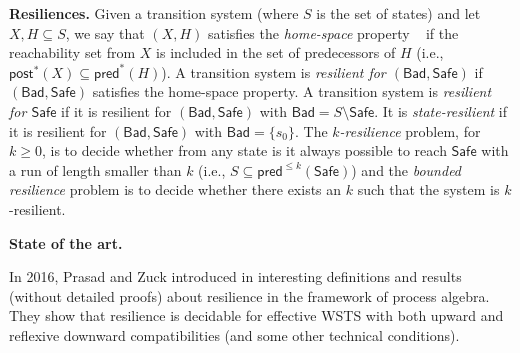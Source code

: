 \documentclass[runningheads]{llncs}
\newcommand{\pred}{\textsf{pred}}
\newcommand{\post}{\textsf{post}}
\newcommand{\Bad}{\textsf{Bad}}
\newcommand{\Safe}{\textsf{Safe}}
\begin{document}
\noindent
{\bf Resiliences.}  
%
Given a transition system (where $S$ is the set of states) and let $X,H \subseteq S$, we say that $(X,H)$ satisfies the \emph{home-space} property ~\cite{DBLP:conf/ac/MemmiV86} if the reachability set from $X$ is included in the set of predecessors of $H$ (i.e., $\post^*(X) \subseteq \pred^*(H)$).
%
A transition system is {\em resilient for $(\Bad,\Safe)$} if $(\Bad,\Safe)$ satisfies the home-space property. A transition system is {\em resilient for $\Safe$} if it is resilient for $(\Bad,\Safe)$ with $\Bad=S \setminus \Safe$. It is {\em state-resilient} if it is resilient for $(\Bad,\Safe)$ with $\Bad=\{s_0\}$.
%
%
%
The {\em $k$-resilience} problem, for $k\geq0$, is to decide whether from any state is it always possible to reach $\Safe$ with a run of length smaller than $k$ (i.e., $S \subseteq \pred^{\leq k}(\Safe)$) and 
the {\em bounded resilience} problem is to decide whether there exists an $k$ such that the system is $k$-resilient.

\noindent
{\bf State of the art.}
%

In 2016, Prasad and Zuck introduced in \cite{DBLP:journals/corr/PrasadZ16} interesting definitions and results (without detailed proofs) about resilience in the framework of process algebra. They show that resilience is decidable for effective WSTS with both upward and reflexive downward compatibilities (and some other technical conditions).

\end{document}
